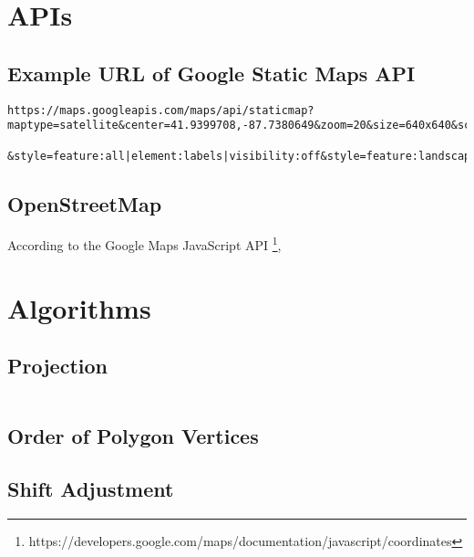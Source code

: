\chapter{APIs}

\section{Example URL of Google Static Maps API}\label{app:apimap}

\begin{lstlisting}
https://maps.googleapis.com/maps/api/staticmap?maptype=satellite&center=41.9399708,-87.7380649&zoom=20&size=640x640&scale=1&key=???

&style=feature:all|element:labels|visibility:off&style=feature:landscape.man_made|element:geometry.stroke|color:0x00ff00
\end{lstlisting}

\section{OpenStreetMap}\label{app:apiosm}

According to the Google Maps JavaScript API \footnote{https://developers.google.com/maps/documentation/javascript/coordinates}, 

\chapter{Algorithms}
\section{Projection}\label{app:projec}

\begin{lstlisting}
\end{lstlisting}

\section{Order of Polygon Vertices}\label{app:revpoly}

\section{Shift Adjustment}\label{app:shift}

